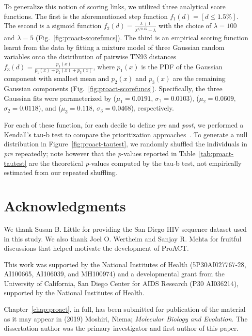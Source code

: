 To generalize this notion of scoring links, we utilized three analytical score functions. The first is the aforementioned step function $f_1(d)=\left[d\le1.5\%\right]$. The second is a sigmoid function $f_2(d)=\frac{\lambda+1}{\lambda^{d/0.15}+\lambda}$ with the choice of $\lambda=100$ and $\lambda=5$ (Fig.~\ref{fig:proact-scorefuncs}). The third is an empirical scoring function learnt from the data by fitting a mixture model of three Gaussian random variables onto the distribution of pairwise \gls{TN93} distances $f_3(d)=\frac{p_1(x)}{p_1(x)+p_2(x)+p_3(x)}$, where $p_1(x)$ is the \gls{PDF} of the Gaussian component with smallest mean and $p_2(x)$ and $p_3(x)$ are the remaining Gaussian components (Fig.~\ref{fig:proact-scorefuncs}). Specifically, the three Gaussian fits were parameterized by ($\mu_1=0.0191$, $\sigma_1=0.0103$), ($\mu_2=0.0609$, $\sigma_2=0.0118$), and ($\mu_3=0.118$, $\sigma_3=0.0468$), respectively.

For each of these function, for each decile to define \textit{pre} and \textit{post}, we performed a Kendall's tau-b test to compare the prioritization approaches~\cite{Kendall1938}. To generate a null distribution in Figure~\ref{fig:proact-tautest}, we randomly shuffled the individuals in \textit{pre} repeatedly; note however that the \textit{p}-values reported in Table~\ref{tab:proact-tautest} are the theoretical \textit{p}-values computed by the tau-b test, not empirically estimated from our repeated shuffling.

\section{Acknowledgments}
We thank Susan B. Little for providing the San Diego \gls{HIV} sequence dataset used in this study. We also thank Joel O. Wertheim and Sanjay R. Mehta for fruitful discussions that helped motivate the development of ProACT.

This work was supported by the National Institutes of Health (5P30AI027767-28, AI100665, AI106039, and MH100974) and a developmental grant from the University of California, San Diego Center for AIDS Research (P30 AI036214), supported by the National Institutes of Health.

Chapter~\ref{chap:proact}, in full, has been submitted for publication of the material as it may appear in (2019) Moshiri, Niema; \textit{Molecular Biology and Evolution}. The dissertation author was the primary investigator and first author of this paper.

